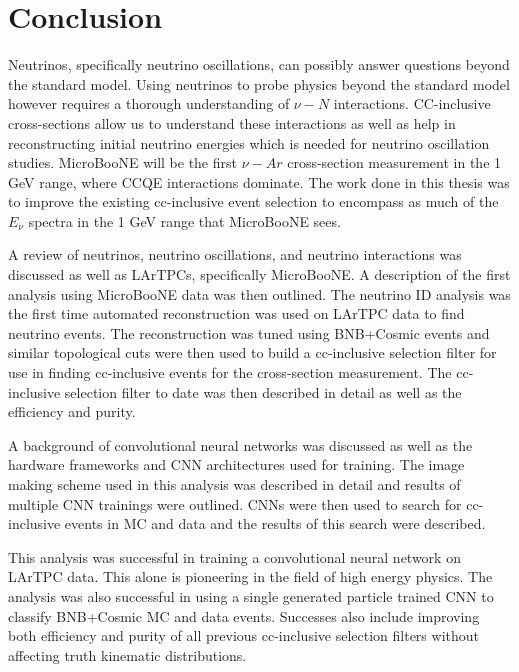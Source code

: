 \chapter{Conclusion}
Neutrinos, specifically neutrino oscillations, can possibly answer questions beyond the standard model. Using neutrinos to probe physics beyond the standard model however requires a thorough understanding of $\nu-N$ interactions. CC-inclusive cross-sections allow us to understand these interactions as well as help in reconstructing initial neutrino energies which is needed for neutrino oscillation studies. MicroBooNE will be the first $\nu-Ar$ cross-section measurement in the 1 GeV range, where CCQE interactions dominate. The work done in this thesis was to improve the existing cc-inclusive event selection to encompass as much of the $E_{\nu}$ spectra in the 1 GeV range that MicroBooNE sees. 

A review of neutrinos, neutrino oscillations, and neutrino interactions was discussed as well as LArTPCs, specifically MicroBooNE. A description of the first analysis using MicroBooNE data was then outlined. The neutrino ID analysis was the first time automated reconstruction was used on LArTPC data to find neutrino events. The reconstruction was tuned using BNB+Cosmic events and similar topological cuts were then used to build a cc-inclusive selection filter for use in finding cc-inclusive events for the cross-section measurement. The cc-inclusive selection filter to date was then described in detail as well as the efficiency and purity.  

A background of convolutional neural networks was discussed as well as the hardware frameworks and CNN architectures used for training. The image making scheme used in this analysis was described in detail and results of multiple CNN trainings were outlined. CNNs were then used to search for cc-inclusive events in MC and data and the results of this search were described. 

This analysis was successful in training a convolutional neural network on LArTPC data. This alone is pioneering in the field of high energy physics. The analysis was also successful in using a single generated particle trained CNN to classify BNB+Cosmic MC and data events. Successes also include improving both efficiency and purity of all previous cc-inclusive selection filters without affecting truth kinematic distributions. 


